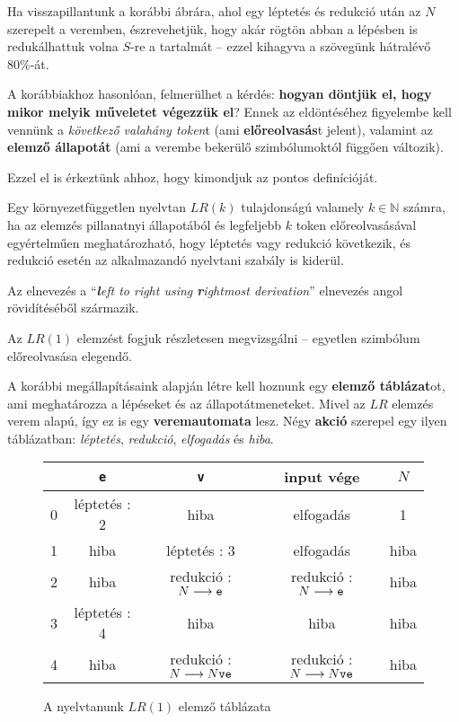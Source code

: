 Ha visszapillantunk a korábbi ábrára, ahol egy léptetés és redukció után az $N$ szerepelt a veremben, észrevehetjük, hogy akár rögtön abban a lépésben is redukálhattuk volna $S$-re a tartalmát -- ezzel kihagyva a szövegünk hátralévő 80\%-át.

A korábbiakhoz hasonlóan, felmerülhet a kérdés: \textbf{hogyan döntjük el, hogy mikor melyik műveletet végezzük el}?
Ennek az eldöntéséhez figyelembe kell vennünk a \textit{következő valahány token}t (ami \textbf{előreolvasás}t jelent), valamint az \textbf{elemző állapotát} (ami a verembe bekerülő szimbólumoktól függően változik).

Ezzel el is érkeztünk ahhoz, hogy kimondjuk az  pontos definícióját.

\begin{tcolorbox}
	\begin{definition}[$LR(k)$ nyelvtan]
		Egy környezetfüggetlen nyelvtan $LR(k)$ tulajdonságú valamely $k \in \mathbb{N}$
		számra, ha az elemzés pillanatnyi állapotából és legfeljebb $k$ token
		előreolvasásával egyértelműen meghatározható, hogy léptetés vagy
		redukció következik, és redukció esetén az alkalmazandó nyelvtani szabály
		is kiderül.
	\end{definition}
\end{tcolorbox}

Az elnevezés a ``\textit{\textbf{l}eft to right using \textbf{r}ightmost derivation}'' elnevezés angol rövidítéséből származik.

Az $LR(1)$ elemzést fogjuk részletesen megvizsgálni -- egyetlen szimbólum előreolvasása elegendő. 

A korábbi megállapításaink alapján létre kell hoznunk egy \textbf{elemző táblázat}ot, ami meghatározza a lépéseket és az állapotátmeneteket. Mivel az $LR$ elemzés verem alapú, így ez is egy \textbf{veremautomata} lesz. Négy \textbf{akció} szerepel egy ilyen táblázatban: \textit{léptetés}, \textit{redukció}, \textit{elfogadás} és \textit{hiba}.

\newpage

\begin{figure}[h!]
	\centering
	\begin{tabular}{|c||c|c|c|c|}
		\hline
		& \texttt{e} & \texttt{v} & input vége & $N$ \\
		\hline\hline
		0 & léptetés : 2 & hiba & elfogadás & 1 \\
		\hline
		1 & hiba & léptetés : 3 & elfogadás & hiba \\
		\hline
		2 & hiba & redukció : $N \longrightarrow \texttt{e}$ & redukció : $N \longrightarrow \texttt{e}$ & hiba \\
		\hline
		3 & léptetés : 4 & hiba & hiba & hiba \\
		\hline
		4 & hiba & redukció : $N \longrightarrow N\texttt{ve}$ & redukció : $N \longrightarrow N\texttt{ve}$ & hiba \\
		\hline
	\end{tabular}
	\caption{A nyelvtanunk $LR(1)$ elemző táblázata}
\end{figure}

